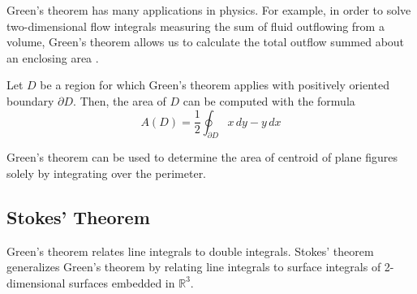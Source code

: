   Green's theorem has many applications in physics. For example, in order to solve two-dimensional flow integrals measuring the sum of fluid outflowing from a volume, Green's theorem allows us to calculate the total outflow summed about an enclosing area . 
		
  \begin{corollary}
    \label{thm:area-via-greens-theorem}
		Let $D$ be a region for which Green's theorem applies with positively oriented boundary $\partial D$. Then, the area of $D$ can be computed with the formula
		\begin{equation}
			A(D) = \frac{1}{2} \oint_{\partial D} x \, d y - y \, d x
		\end{equation}
  \end{corollary}
		
  Green's theorem can be used to determine the area of centroid of plane figures solely by integrating over the perimeter. 
		
\subsection{Stokes' Theorem}
		
  Green's theorem relates line integrals to double integrals. Stokes' theorem generalizes Green's theorem by relating line integrals to surface integrals of 2-dimensional surfaces embedded in $\mathbb{R}^3$. 
		
